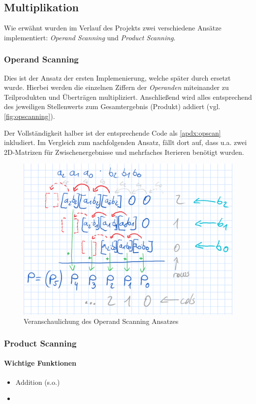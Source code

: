 \subsection{Multiplikation}
    Wie erwähnt wurden im Verlauf des Projekts zwei verschiedene Ansätze implementiert: \emph{Operand Scanning} und \emph{Product Scanning}.

    \subsubsection{Operand Scanning} \label{sec:opscanning}
    Dies ist der Ansatz der ersten Implemenierung, welche später durch  ersetzt wurde.
    Hierbei werden die einzelnen Ziffern der \emph{Operanden} miteinander zu Teilprodukten und Überträgen multipliziert. Anschließend wird alles entsprechend des jeweiligen Stellenwerts zum Gesamtergebnis (Produkt) addiert (vgl. \autoref{fig:opscanning}).

    Der Vollständigkeit halber ist der entsprechende Code als \autoref{apdx:opscan} inkludiert.
    Im Vergleich zum nachfolgenden Ansatz, fällt dort auf, dass u.a. zwei 2D-Matrizen für Zwischenergebnisse und mehrfaches Iterieren benötigt wurden.

    \begin{figure}[H]
        \centering
        \includegraphics[width=0.7\linewidth]{images/opscanning}
        \caption{Veranschaulichung des Operand Scanning Ansatzes}
        \label{fig:opscanning}
    \end{figure}

\subsubsection{Product Scanning} \label{sec:prodscan}

    \paragraph*{Wichtige Funktionen}
    \begin{itemize} \tightlist
        \item Addition (s.o.)
        \item {}
    \end{itemize}

